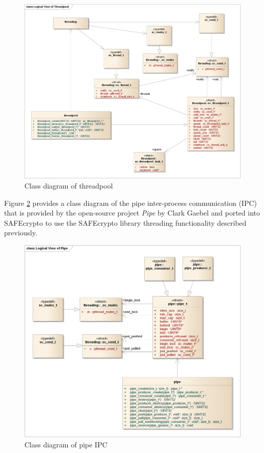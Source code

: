 \begin{figure}[!h]
\centering
\includegraphics[width=\textwidth]{libsafecrypto_threadpool_logical_view.png}
\caption{Class diagram of threadpool}
\label{fig:safecrypto_threadpool}
\end{figure}

\newpage
Figure \ref{fig:safecrypto_pipe} provides a class diagram of the pipe inter-process communication (IPC) that is provided by the open-source project \textit{Pipe} by Clark Gaebel and ported into SAFEcrypto to use the SAFEcrypto library threading functionality described previously.

\begin{figure}[!h]
\centering
\includegraphics[width=\textwidth]{libsafecrypto_pipe_logical_view.png}
\caption{Class diagram of pipe IPC}
\label{fig:safecrypto_pipe}
\end{figure}

